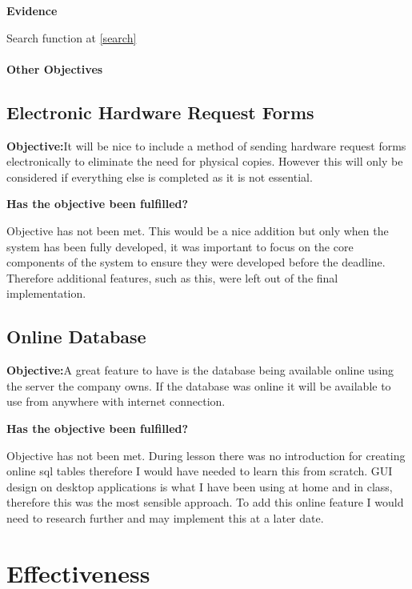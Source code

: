 \textbf{Evidence}

Search function at \ref{search}


\paragraph{Other Objectives}

\subsection{Electronic Hardware Request Forms}

\textbf{Objective:}It will be nice to include a method of sending hardware request forms electronically to eliminate the need for physical copies. However this will only be considered if everything else is completed as it is not essential.

\textbf{Has the objective been fulfilled?}

Objective has not been met. This would be a nice addition but only when the system has been fully developed, it was important to focus on the core components of the system to ensure they were developed before the deadline. Therefore additional features, such as this, were left out of the final implementation.



\subsection{Online Database}

\textbf{Objective:}A great feature to have is the database being available online using the server the company owns. If the database was online it will be available to use from anywhere with internet connection.

\textbf{Has the objective been fulfilled?}

Objective has not been met. During lesson there was no introduction for creating online sql tables therefore I would have needed to learn this from scratch. GUI design on desktop applications is what I have been using at home and in class, therefore this was the most sensible approach. To add this online feature I would need to research further and may implement this at a later date.


\section{Effectiveness}

